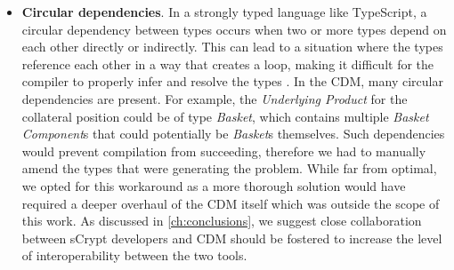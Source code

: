 \begin{itemize}
    \item \label{item:circular_deps} \textbf{Circular dependencies}. In a strongly typed language like TypeScript, a circular dependency between types occurs when two or more types depend on each other directly or indirectly. This can lead to a situation where the types reference each other in a way that creates a loop, making it difficult for the compiler to properly infer and resolve the types \citep{circular_dependencies}. In the CDM, many circular dependencies are present. For example, the \textit{Underlying Product} for the collateral position could be of type \textit{Basket}, which contains multiple \textit{Basket Component}s that could potentially be \textit{Basket}s themselves. Such dependencies would prevent compilation from succeeding, therefore we had to manually amend the types that were generating the problem. While far from optimal, we opted for this workaround as a more thorough solution would have required a deeper overhaul of the CDM itself which was outside the scope of this work. As discussed in \ref{ch:conclusions}, we suggest close collaboration between sCrypt developers and CDM should be fostered to increase the level of interoperability between the two tools.

    
\end{itemize}